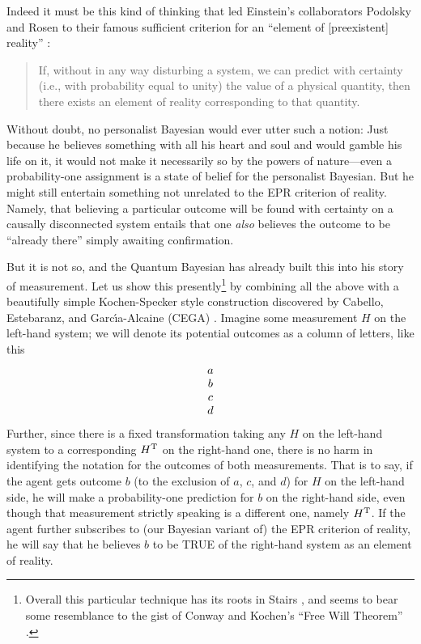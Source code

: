 Indeed it must be this kind of thinking that led Einstein's collaborators Podolsky and Rosen to their famous sufficient criterion for an ``element of [preexistent] reality'' \cite{Fine96}:
\begin{quote}\small
If, without in any way disturbing a system, we can predict with certainty (i.e., with probability equal to unity) the value of a physical quantity, then there exists an element of reality corresponding to that quantity.
\end{quote}
Without doubt, no personalist Bayesian would ever utter such a notion:  Just because he believes something with all his heart and soul and would gamble his life on it, it would not make it necessarily so by the powers of nature---even a probability-one assignment is a state of belief for the personalist Bayesian.  But he might still entertain something not unrelated to the EPR criterion of reality.  Namely, that believing a particular outcome will be found with certainty on a causally disconnected system entails that one {\it also\/} believes the outcome to be ``already there'' simply awaiting confirmation.

But it is not so, and the Quantum Bayesian has already built this into his story of measurement.  Let us show this presently\footnote{Overall this particular technique has its roots in Stairs \cite{Stairs83}, and seems to bear some resemblance to the gist of Conway and Kochen's ``Free Will Theorem'' \cite{Conway06,Conway09}. } by combining all the above with a beautifully simple Kochen-Specker style construction discovered by Cabello, Estebaranz, and Garc\'{\i}a-Alcaine (CEGA) \cite{Cabello97}.  Imagine some measurement $H$ on the left-hand system; we will denote its potential outcomes as a column of letters, like this
\begin{equation}
\veec abcd
\end{equation}
Further, since there is a fixed transformation taking any $H$ on the left-hand system to a corresponding $H^{\rm\small T}$ on the right-hand one, there is no harm in identifying the notation for the outcomes of both measurements.  That is to say, if the agent gets outcome $b$ (to the exclusion of $a$, $c$, and $d$) for $H$ on the left-hand side, he will make a probability-one prediction for $b$ on the right-hand side, even though that measurement strictly speaking is a different one, namely $H^{\rm\small T}$.  If the agent further subscribes to (our Bayesian variant of) the EPR criterion of reality, he will say that he believes $b$ to be TRUE of the right-hand system as an element of reality.


